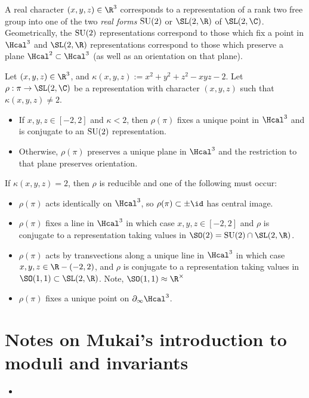 \documentclass[11pt]{amsart}
\begin{document}
A real character $(x,y,z)\in\R^3$ corresponds to a representation of a rank two free group into one of the two \emph{real forms} $\operatorname{SU}(2)$ or $\SL(2,\R)$ of $\SL(2,\C)$. Geometrically, the $\operatorname{SU}(2)$ representations correspond to those which fix a point in $\Hcal^3$ and $\SL(2,\R)$ representations correspond to those which preserve a plane $\Hcal^2 \subset \Hcal^3$ (as well as an orientation on that plane). 

\begin{thm}
Let $(x,y,z)\in \R^3$, and $\kappa(x,y,z):= x^2+y^2+z^2 -xyz-2$. Let $\rho:\pi \to \SL(2,\C)$ be a representation with character $(x,y,z)$ such that $\kappa(x,y,z)\neq 2$. 
\begin{itemize}
	\item If $x,y,z \in [-2,2]$ and $\kappa <2$, then $\rho(\pi)$ fixes a unique point in $\Hcal^3$ and is conjugate to an $\operatorname{SU}(2)$ representation. 
	\item Otherwise, $\rho(\pi)$ preserves a unique plane in $\Hcal^3$ and the restriction to that plane preserves orientation. 	
\end{itemize}
	If $\kappa(x,y,z)=2$, then $\rho$ is reducible and one of the following must occur:
\begin{itemize}
	\item $\rho(\pi)$ acts identically on $\Hcal^3$, so $\rho(\pi) \subset \pm \id$ has central image. 
	\item $\rho(\pi)$ fixes a line in $\Hcal^3$ in which case $x,y,z\in [-2,2]$ and $\rho$ is conjugate to a representation taking values in $\SO(2)=\SU(2)\cap \SL(2,\R)$. 
	\item $\rho(\pi)$ acts by transvections along a unique line in $\Hcal^3$ in which case $x,y,z\in \R -(-2,2)$, and $\rho$ is conjugate to a representation taking values in $\SO(1,1)\subset \SL(2,\R)$. Note, $\SO(1,1)\approx \R^\times $ 
	\item $\rho(\pi)$ fixes a unique point on $\del_\infty \Hcal^3$. 
\end{itemize}
	
\end{thm}

	\section{Notes on Mukai's introduction to moduli and invariants}
	\begin{itemize}
		\item 
	\end{itemize}
   
\end{document}
